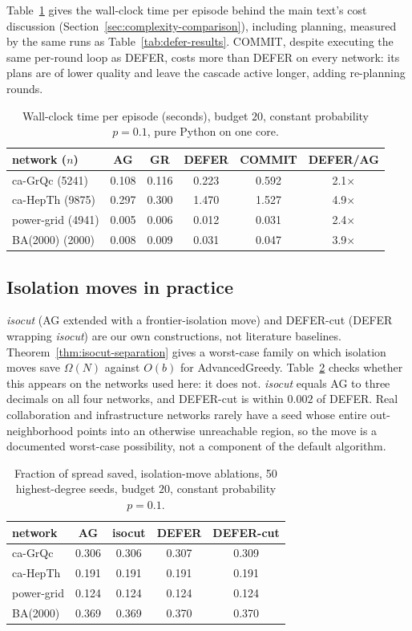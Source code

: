 \documentclass[preprint,11pt]{elsarticle}
\theoremstyle{definition}
\theoremstyle{remark}
\newcommand{\up}{\rule{0pt}{2.6ex}}
\begin{document}
Table~\ref{tab:timing} gives the wall-clock time per episode behind the main text's cost discussion (Section~\ref{sec:complexity-comparison}), including planning, measured by the same runs as Table~\ref{tab:defer-results}. COMMIT, despite executing the same per-round loop as DEFER, costs more than DEFER on every network: its plans are of lower quality and leave the cascade active longer, adding re-planning rounds.

\begin{table}[h]
\centering
\caption{Wall-clock time per episode (seconds), budget $20$, constant probability $p=0.1$, pure Python on one core.\label{tab:timing}}
\small
\begin{tabular}{@{}lccccc@{}}
\hline
\up network ($n$) & AG & GR & DEFER & COMMIT & DEFER/AG \\
\hline
\up ca-GrQc (5241) & 0.108 & 0.116 & 0.223 & 0.592 & 2.1$\times$ \\
ca-HepTh (9875) & 0.297 & 0.300 & 1.470 & 1.527 & 4.9$\times$ \\
power-grid (4941) & 0.005 & 0.006 & 0.012 & 0.031 & 2.4$\times$ \\
BA(2000) (2000) & 0.008 & 0.009 & 0.031 & 0.047 & 3.9$\times$ \\
\hline
\end{tabular}
\end{table}

\subsection{Isolation moves in practice}\label{sec:isocut-practice}

\emph{isocut} (AG extended with a frontier-isolation move) and DEFER-cut (DEFER wrapping \emph{isocut}) are our own constructions, not literature baselines. Theorem~\ref{thm:isocut-separation} gives a worst-case family on which isolation moves save $\Omega(N)$ against $O(b)$ for AdvancedGreedy. Table~\ref{tab:isocut} checks whether this appears on the networks used here: it does not. \emph{isocut} equals AG to three decimals on all four networks, and DEFER-cut is within $0.002$ of DEFER. Real collaboration and infrastructure networks rarely have a seed whose entire out-neighborhood points into an otherwise unreachable region, so the move is a documented worst-case possibility, not a component of the default algorithm.

\begin{table}[h]
\centering
\caption{Fraction of spread saved, isolation-move ablations, 50 highest-degree seeds, budget $20$, constant probability $p=0.1$.\label{tab:isocut}}
\small
\begin{tabular}{@{}lcccc@{}}
\hline
\up network & AG & isocut & DEFER & DEFER-cut \\
\hline
\up ca-GrQc & 0.306 & 0.306 & 0.307 & 0.309 \\
ca-HepTh & 0.191 & 0.191 & 0.191 & 0.191 \\
power-grid & 0.124 & 0.124 & 0.124 & 0.124 \\
BA(2000) & 0.369 & 0.369 & 0.370 & 0.370 \\
\hline
\end{tabular}
\end{table}
\end{document}
